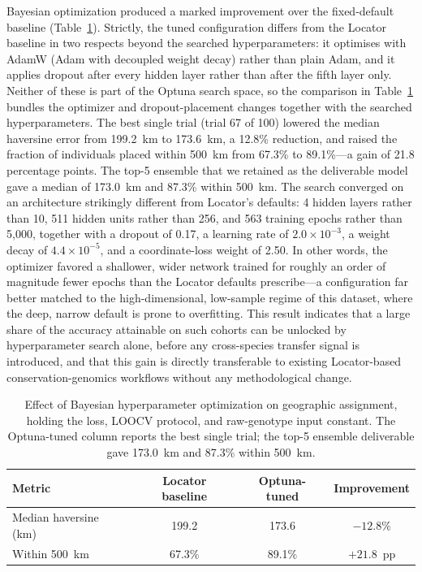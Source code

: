 \documentclass[twocolumn,10pt]{article}
\begin{document}
Bayesian optimization produced a marked improvement over the fixed-default baseline
(Table~\ref{tab:bayesopt}). Strictly, the tuned configuration differs from the Locator baseline in
two respects beyond the searched hyperparameters: it optimises with AdamW (Adam with decoupled
weight decay) rather than plain Adam, and it applies dropout after every hidden layer rather than
after the fifth layer only. Neither of these is part of the Optuna search space, so the comparison
in Table~\ref{tab:bayesopt} bundles the optimizer and dropout-placement changes together with the
searched hyperparameters. The best single trial (trial 67 of 100) lowered the median haversine error
from 199.2~km to 173.6~km, a 12.8\% reduction, and raised the fraction of individuals placed within
500~km from 67.3\% to 89.1\%---a gain of 21.8 percentage points. The top-5 ensemble that we retained
as the deliverable model gave a median of 173.0~km and 87.3\% within 500~km. The search converged on
an architecture strikingly different from Locator's defaults: 4 hidden layers rather than 10, 511
hidden units rather than 256, and 563 training epochs rather than 5{,}000, together with a dropout
of 0.17, a learning rate of $2.0\times10^{-3}$, a weight decay of $4.4\times10^{-5}$, and a
coordinate-loss weight of 2.50. In other words, the optimizer favored a shallower, wider network
trained for roughly an order of magnitude fewer epochs than the Locator defaults prescribe---a
configuration far better matched to the high-dimensional, low-sample regime of this dataset, where
the deep, narrow default is prone to overfitting. This result indicates that a large share of the
accuracy attainable on such cohorts can be unlocked by hyperparameter search alone, before any
cross-species transfer signal is introduced, and that this gain is directly transferable to existing
Locator-based conservation-genomics workflows without any methodological change.

\begin{table}[t]
\centering
\caption{Effect of Bayesian hyperparameter optimization on geographic assignment, holding the loss,
LOOCV protocol, and raw-genotype input constant. The Optuna-tuned column reports the best single
trial; the top-5 ensemble deliverable gave 173.0~km and 87.3\% within 500~km.}
\label{tab:bayesopt}
\begin{tabular}{lccc}
\toprule
Metric & Locator baseline & Optuna-tuned & Improvement \\
\midrule
Median haversine (km) & 199.2 & 173.6 & $-12.8\%$ \\
Within 500~km & 67.3\% & 89.1\% & $+21.8$~pp \\
\bottomrule
\end{tabular}
\end{table}
\end{document}
